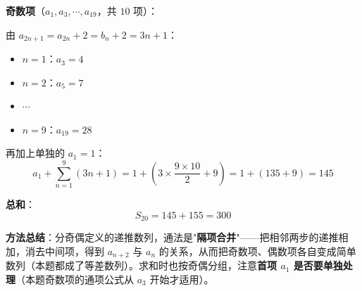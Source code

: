 \begin{answer}
\textbf{奇数项}（$a_1,a_3,\cdots,a_{19}$，共 $10$ 项）：

由 $a_{2n+1}=a_{2n}+2=b_n+2=3n+1$：
\begin{itemize}
\item $n=1$：$a_3=4$
\item $n=2$：$a_5=7$
\item $\cdots$
\item $n=9$：$a_{19}=28$
\end{itemize}

再加上单独的 $a_1=1$：
\nopagebreak[4]
\[a_1+\sum_{n=1}^{9}(3n+1)=1+\left(3\times\frac{9\times10}2+9\right)=1+(135+9)=145\]

\textbf{总和}：
\nopagebreak[4]
\[S_{20}=145+155=300\]

\begin{gktip}
\textbf{方法总结}：分奇偶定义的递推数列，通法是"\textbf{隔项合并}"——把相邻两步的递推相加，消去中间项，得到 $a_{n+2}$ 与 $a_n$ 的关系，从而把奇数项、偶数项各自变成简单数列（本题都成了等差数列）。求和时也按奇偶分组，注意\textbf{首项 $a_1$ 是否要单独处理}（本题奇数项的通项公式从 $a_3$ 开始才适用）。
\end{gktip}



\par\medskip

\end{answer}

